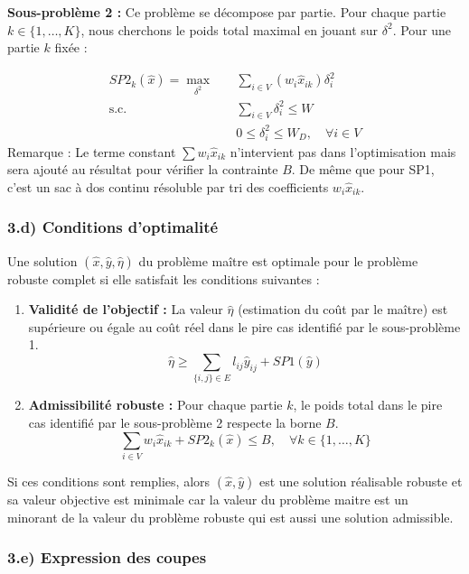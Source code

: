 \documentclass{article}
\begin{document}
\textbf{Sous-problème 2 :}
Ce problème se décompose par partie. Pour chaque partie $k \in \{1, \dots, K\}$, nous cherchons le poids total maximal en jouant sur $\delta^2$. Pour une partie $k$ fixée :

\begin{align*}
    SP2_k(\hat{x}) = \max_{\delta^2} \quad & \sum_{i \in V} \left( w_i \hat{x}_{ik} \right) \delta_{i}^2 \\
    \text{s.c.} \quad & \sum_{i \in V} \delta_{i}^2 \le W \\
    & 0 \le \delta_{i}^2 \le W_D, \quad \forall i \in V
\end{align*}
Remarque : Le terme constant $\sum w_i \hat{x}_{ik}$ n'intervient pas dans l'optimisation mais sera ajouté au résultat pour vérifier la contrainte $B$. De même que pour SP1, c'est un sac à dos continu résoluble par tri des coefficients $w_i \hat{x}_{ik}$.

\subsubsection*{3.d) Conditions d'optimalité}

Une solution $(\hat{x}, \hat{y}, \hat{\eta})$ du problème maître est optimale pour le problème robuste complet si elle satisfait les conditions suivantes :

\begin{enumerate}
    \item \textbf{Validité de l'objectif :} La valeur $\hat{\eta}$ (estimation du coût par le maître) est supérieure ou égale au coût réel dans le pire cas identifié par le sous-problème 1.
    \[
    \hat{\eta} \ge \sum_{\{i,j\} \in E} l_{ij} \hat{y}_{ij} + SP1(\hat{y})
    \]
    \item \textbf{Admissibilité robuste :} Pour chaque partie $k$, le poids total dans le pire cas identifié par le sous-problème 2 respecte la borne $B$.
    \[
    \sum_{i \in V} w_i \hat{x}_{ik} + SP2_k(\hat{x}) \le B, \quad \forall k \in \{1, \dots, K\}
    \]
\end{enumerate}

Si ces conditions sont remplies, alors $(\hat{x}, \hat{y})$ est une solution réalisable robuste et sa valeur objective est minimale car la valeur du problème maitre est un minorant de la valeur du problème robuste qui est aussi une solution admissible.

\subsubsection*{3.e) Expression des coupes}
\end{document}
